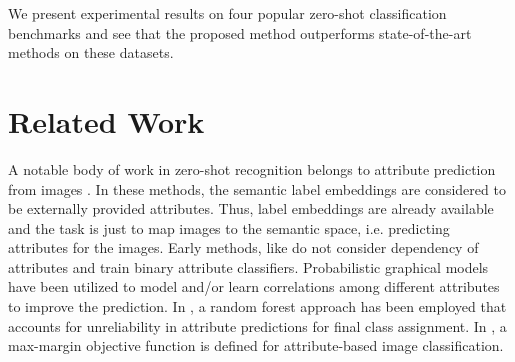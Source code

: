 \documentclass[10pt,twocolumn,letterpaper]{article}
\begin{document}
We present experimental results on four popular zero-shot classification benchmarks
 and see that the proposed method outperforms state-of-the-art methods on these datasets.


\section{Related Work} \label{related}

A notable body of work in zero-shot recognition belongs to attribute prediction from images \cite{lampert09,topicmodel,ajoint11,unified13,suzuki14}.
In these methods, the semantic label embeddings are considered to be externally provided attributes. Thus, label embeddings are already available
 and the task is just to map images to the semantic space, i.e. predicting attributes for the images.
Early methods, like \cite{lampert09} do not consider dependency of attributes and train binary attribute classifiers.
Probabilistic graphical models have been utilized to model and/or learn correlations among different attributes \cite{topicmodel,unified13}
 to improve the prediction.
In \cite{jayaraman14}, a random forest approach has been employed that accounts for unreliability in attribute predictions for final class assignment.
In \cite{akata13}, a max-margin objective function
is defined for attribute-based image classification.
\end{document}
